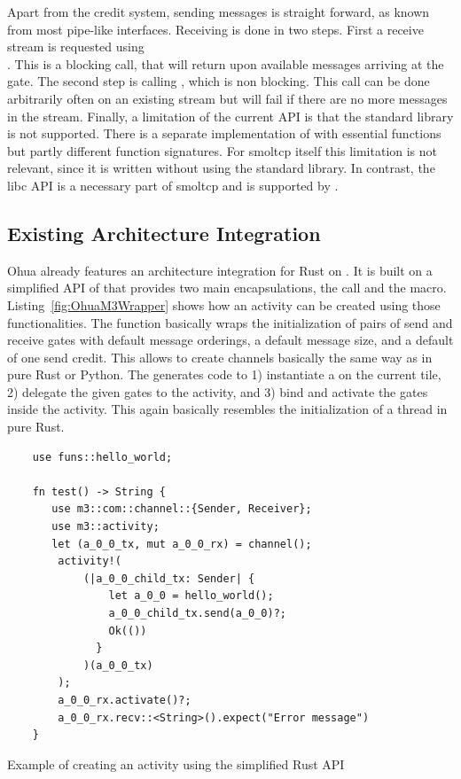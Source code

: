 Apart from the credit system, sending messages is straight forward, as known from most pipe-like interfaces. Receiving is done in two steps. First a receive stream is requested using \\
. This is a blocking call, that will return upon available messages arriving at the gate. The second step is calling , which is non blocking. This call can be done arbitrarily often on an existing stream but will fail if there are no more messages in the stream. Finally, a limitation of the current \md API is that the standard library is not supported. There is a separate implementation of  with essential functions but partly different function signatures. For smoltcp itself this limitation is not relevant, since it is written without using the standard library. In contrast, the libc API is a necessary part of smoltcp and is supported by \md. 

\subsection{Existing \md Architecture Integration}
Ohua already features an architecture integration for Rust on \md. It is built on a simplified API of \md that provides two main encapsulations, the  call and the  macro. Listing~\ref{fig:OhuaM3Wrapper} shows how an activity can be created using those functionalities. The function  basically wraps the initialization of pairs of send and receive gates with default message orderings, a default message size, and a default of one send credit. This allows to create channels basically the same way as in pure Rust or Python. The  generates code to 1) instantiate a  on the current tile, 2) delegate the given gates to the activity, and 3) bind and activate the gates inside the activity. This again basically resembles the initialization of a thread in pure Rust. 


\begin{codefigure}
    \centering
    \begin{verbatim}
    use funs::hello_world;
    
    fn test() -> String {
       use m3::com::channel::{Sender, Receiver};
       use m3::activity;
       let (a_0_0_tx, mut a_0_0_rx) = channel(); 
        activity!(
            (|a_0_0_child_tx: Sender| {    
                let a_0_0 = hello_world();
                a_0_0_child_tx.send(a_0_0)?;
                Ok(())
              }
            )(a_0_0_tx)
        );
        a_0_0_rx.activate()?;
        a_0_0_rx.recv::<String>().expect("Error message")
    }

    \end{verbatim}
    \caption{Example of creating an activity using the simplified \md Rust API}
    \label{fig:OhuaM3Wrapper}
\end{codefigure}

